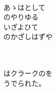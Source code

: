 \documentclass[10pt,b5j]{tarticle} %
\begin{document}
\begin{enumerate}
\begin{minipage}[c]{\blocksize}
    \end{minipage}
    \begin{minipage}[c]{\blocksize}
        
        \vspace{\linespace}
        \item~\\
        あゝはとして\\
        のやりゆる\\
        いざよひて\\
        のかざしはずや
        
        
    \end{minipage}
    \begin{minipage}[c]{\blocksize}
        
        \vspace{\linespace}
        \item~\\
        \\
        はクラークのを\\
        うでられた。
    
    \end{minipage}
\end{enumerate} %
\end{document}
